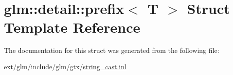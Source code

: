 \hypertarget{structglm_1_1detail_1_1prefix}{\section{glm\-:\-:detail\-:\-:prefix$<$ T $>$ Struct Template Reference}
\label{structglm_1_1detail_1_1prefix}
}


The documentation for this struct was generated from the following file\-:\begin{DoxyCompactItemize}
\item 
ext/glm/include/glm/gtx/\hyperlink{string__cast_8inl}{string\-\_\-cast.\-inl}\end{DoxyCompactItemize}
